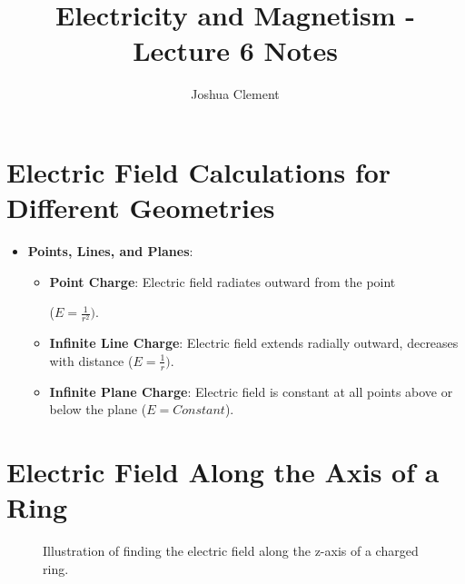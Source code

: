 \documentclass{article}
\begin{document}
\title{Electricity and Magnetism - Lecture 6 Notes}
\author{Joshua Clement}
\maketitle


\section*{Electric Field Calculations for Different Geometries}
\begin{itemize}
    \item \textbf{Points, Lines, and Planes}:
    \begin{itemize}
        \item \textbf{Point Charge}: Electric field radiates outward from the point

        (\(E = \frac{1}{r^2})\).
        \item \textbf{Infinite Line Charge}: Electric field extends radially outward, decreases with distance (\(E = \frac{1}{r})\).
        \item \textbf{Infinite Plane Charge}: Electric field is constant at all points above or below the plane (\(E = Constant\)).
    \end{itemize}
\end{itemize}

\section*{Electric Field Along the Axis of a Ring}

\begin{figure}[h!]
    \centering
    \caption{Illustration of finding the electric field along the z-axis of a charged ring.}
    \label{fig:ring_field}
\end{figure}
\end{document}
